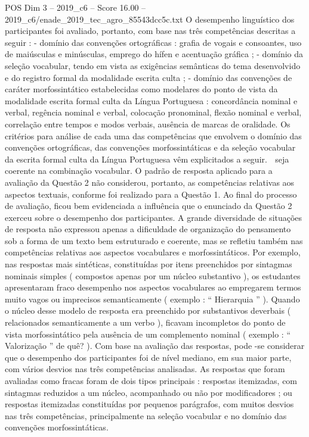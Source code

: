 \begin{textsample}{POS Dim 3 – 2019\_c6 – Score 16.00 – 2019\_c6/enade\_2019\_tec\_agro\_85543dcc5c.txt}
O desempenho linguístico dos participantes foi avaliado, portanto, com base nas três competências descritas a seguir : - domínio das convenções ortográficas : grafia de vogais e consoantes, uso de maiúsculas e minúsculas, emprego do hífen e acentuação gráfica ; - domínio da seleção vocabular, tendo em vista as exigências semânticas do tema desenvolvido e do registro formal da modalidade escrita culta ; - domínio das convenções de caráter morfossintático estabelecidas como modelares do ponto de vista da modalidade escrita formal culta da Língua Portuguesa : concordância nominal e verbal, regência nominal e verbal, colocação pronominal, flexão nominal e verbal, correlação entre tempos e modos verbais, ausência de marcas de oralidade.
Os critérios para análise de cada uma das competências que envolvem o domínio das convenções ortográficas, das convenções morfossintáticas e da seleção vocabular da escrita formal culta da Língua Portuguesa vêm explicitados a seguir.  seja coerente na combinação vocabular.
O padrão de resposta aplicado para a avaliação da Questão 2 não considerou, portanto, as competências relativas aos aspectos textuais, conforme foi realizado para a Questão 1.
Ao final do processo de avaliação, ficou bem evidenciada a influência que o enunciado da Questão 2 exerceu sobre o desempenho dos participantes.
A grande diversidade de situações de resposta não expressou apenas a dificuldade de organização do pensamento sob a forma de um texto bem estruturado e coerente, mas se refletiu também nas competências relativas aos aspectos vocabulares e morfossintáticos.
Por exemplo, nas respostas mais sintéticas, constituídas por itens preenchidos por sintagmas nominais simples ( compostos apenas por um núcleo substantivo ), os estudantes apresentaram fraco desempenho nos aspectos vocabulares ao empregarem termos muito vagos ou imprecisos semanticamente ( exemplo : “ Hierarquia ” ).
Quando o núcleo desse modelo de resposta era preenchido por substantivos deverbais ( relacionados semanticamente a um verbo ), ficavam incompletos do ponto de vista morfossintático pela ausência de um complemento nominal ( exemplo : “ Valorização ” de quê? ).
Com base na avaliação das respostas, pode -se considerar que o desempenho dos participantes foi de nível mediano, em sua maior parte, com vários desvios nas três competências analisadas.
As respostas que foram avaliadas como fracas foram de dois tipos principais : respostas itemizadas, com sintagmas reduzidos a um núcleo, acompanhado ou não por modificadores ; ou respostas itemizadas constituídas por pequenos parágrafos, com muitos desvios nas três competências, principalmente na seleção vocabular e no domínio das convenções morfossintáticas.

\end{textsample}
